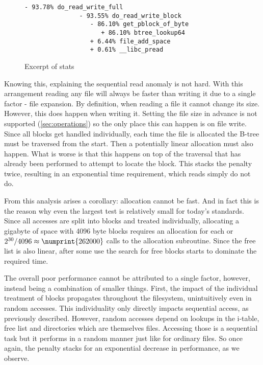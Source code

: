         \begin{wrapfigure}[8]{r}{0.45\textwidth}
            \vspace{-20pt}
            \begin{lstlisting}[gobble=12]
            - 93.78% do_read_write_full
               - 93.55% do_read_write_block
                  - 86.10% get_pblock_of_byte
                     + 86.10% btree_lookup64
                  + 6.44% file_add_space
                  + 0.61% __libc_pread
            \end{lstlisting}
            \caption{Excerpt of  stats}
            \label{fig:perf_sample}
        \end{wrapfigure}

        Knowing this, explaining the sequential read anomaly is not hard. With
        this arrangement reading any file will always be faster than writing it
        due to a single factor - file expansion. By definition, when reading a
        file it cannot change its size. However, this does happen when writing
        it. Setting the file size in advance is not supported
        (\autoref{sec:operations}) so the only place this can happen is on file
        write. Since all blocks get handled individually, each time the file is
        allocated the B-tree must be traversed from the start. Then a
        potentially linear allocation must also happen. What is worse is that
        this happens on top of the traversal that has already been performed to
        attempt to locate the block. This stacks the penalty twice, resulting
        in an exponential time requirement, which reads simply do not do.

        From this analysis arises a corollary: allocation cannot be fast. And
        in fact this is the reason why even the largest test is relatively
        small for today's standards. Since all accesses are split into blocks
        and treated individually, allocating a gigabyte of space with 4096 byte
        blocks requires an allocation for each or $2^{30} / 4096 \approx
        \numprint{262000}$ calls to the allocation subroutine. Since the
        free list is also linear, after some use the search for free
        blocks starts to dominate the required time.

        The overall poor performance cannot be attributed to a single factor,
        however, instead being a combination of smaller things. First, the
        impact of the individual treatment of blocks propagates throughout the
        filesystem, unintuitively even in random accesses. This individuality
        only directly impacts sequential access, as previously described.
        However, random accesses depend on lookups in the i-table, free list
        and directories which are themselves files. Accessing those is a
        sequential task but it performs in a random manner just like for ordinary files. So once again, the
        penalty stacks for an exponential decrease in performance, as we
        observe.

